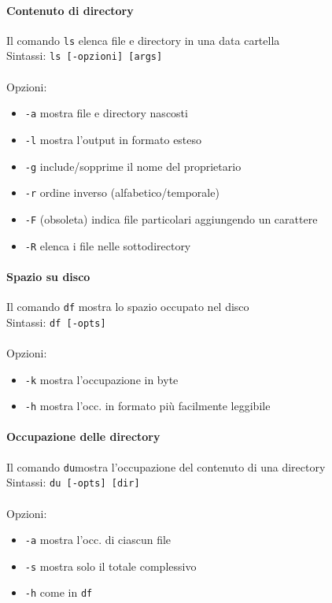 \documentclass[a4paper]{article}
\begin{document}
\paragraph{Contenuto di directory}Il comando \verb|ls| elenca file e directory in una data cartella \\
Sintassi: \verb|ls [-opzioni] [args]| \\ \\
Opzioni:
\begin{itemize}
\item \verb|-a| mostra file e directory nascosti
\item \verb|-l| mostra l'output in formato esteso
\item \verb|-g| include/sopprime il nome del proprietario
\item \verb|-r| ordine inverso (alfabetico/temporale)
\item \verb|-F| (obsoleta) indica file particolari aggiungendo un carattere
\item \verb|-R| elenca i file nelle sottodirectory
\end{itemize}

\paragraph{Spazio su disco} Il comando \verb|df| mostra lo spazio occupato nel disco \\
Sintassi: \verb|df [-opts]| \\ \\
Opzioni:
\begin{itemize}
\item \verb|-k| mostra l'occupazione in byte
\item \verb|-h| mostra l'occ. in formato più facilmente leggibile
\end{itemize}
\paragraph{Occupazione delle directory} Il comando \verb|du|mostra l'occupazione del contenuto di una directory \\
Sintassi: \verb|du [-opts] [dir]| \\ \\
Opzioni:
\begin{itemize}
\item \verb|-a| mostra l'occ. di ciascun file
\item \verb|-s| mostra solo il totale complessivo
\item \verb|-h| come in \verb|df|
\end{itemize}
\end{document}
